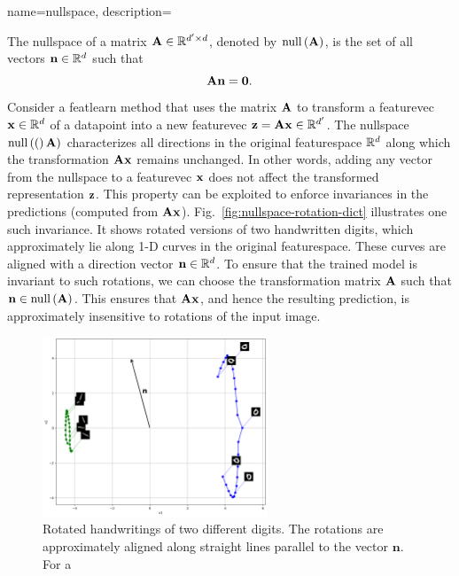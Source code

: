 {name={nullspace},
	description={The nullspace of a \gls{matrix} ${\bf A} \in \mathbb{R}^{d' \times d}$, 
		denoted by ${\rm null}\left({\bf A} \right)$, is the set of all \glspl{vector} $\mathbf{n} \in \mathbb{R}^d$ 
    		such that $${\bf A} \mathbf{n} = \mathbf{0}.$$ 
		Consider a \gls{featlearn} method that uses the \gls{matrix} ${\bf A}$ to transform 
		a \gls{featurevec} $\mathbf{x} \in \mathbb{R}^{d}$ of a \gls{datapoint} 
		into a new \gls{featurevec} ${\bf z} = {\bf A} \mathbf{x} \in \mathbb{R}^{d'}$. 
		The nullspace ${\rm null}\left(( \right){\bf A})$ characterizes all directions in the original 
    		\gls{featurespace} $\mathbb{R}^{d}$ along which the transformation 
		${\bf A} \mathbf{x}$ remains unchanged. In other words, adding any \gls{vector} from 
		the nullspace to a \gls{featurevec} ${\bf x}$ does not affect the transformed 
		representation ${\bf z}$. This property can be exploited to enforce invariances in the 
		\glspl{prediction} (computed from ${\bf A} \mathbf{x}$). Fig.\ \ref{fig:nullspace-rotation-dict} 
		illustrates one such invariance. It shows rotated versions of two handwritten digits, 
		which approximately lie along 1-D curves in the original \gls{featurespace}. 
		These curves are aligned with a direction \gls{vector} $\mathbf{n} \in \mathbb{R}^{d}$. 
    		To ensure that the trained \gls{model} is invariant to such rotations, we can 
		choose the transformation \gls{matrix} ${\bf A}$ such that $\mathbf{n} \in {\rm null}\left({\bf A} \right)$. 
		This ensures that ${\bf A} \mathbf{x}$, and hence the resulting \gls{prediction}, 
		is approximately insensitive to rotations of the input image.
		\begin{figure}[H]
      			\centering
      			\includegraphics[width=0.6\textwidth]{assets/pythonsnacks/nullspace_0_1.png}
	  		\caption{
			Rotated handwritings of two different digits. The rotations are approximately 
			aligned along straight lines parallel to the \gls{vector} $\mathbf{n}$. For a 
}
\end{figure}}}

